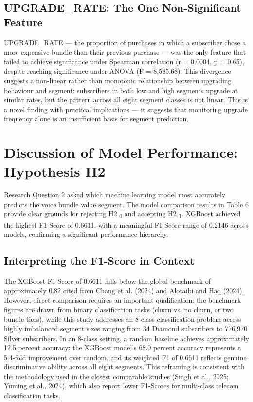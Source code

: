 \subsection{UPGRADE\_RATE: The One Non-Significant Feature}

UPGRADE\_RATE --- the proportion of purchases in which a subscriber chose a more expensive bundle than their previous purchase --- was the only feature that failed to achieve significance under Spearman correlation (r = 0.0004, p = 0.65), despite reaching significance under ANOVA (F = 8,585.68). This divergence suggests a non-linear rather than monotonic relationship between upgrading behaviour and segment: subscribers in both low and high segments upgrade at similar rates, but the pattern across all eight segment classes is not linear. This is a novel finding with practical implications --- it suggests that monitoring upgrade frequency alone is an insufficient basis for segment prediction.


\section{Discussion of Model Performance: Hypothesis H2}

Research Question 2 asked which machine learning model most accurately predicts the voice bundle value segment. The model comparison results in Table 6 provide clear grounds for rejecting H2	\textsubscript{0} and accepting H2	\textsubscript{1}. XGBoost achieved the highest F1-Score of 0.6611, with a meaningful F1-Score range of 0.2146 across models, confirming a significant performance hierarchy.


\subsection{Interpreting the F1-Score in Context}

The XGBoost F1-Score of 0.6611 falls below the global benchmark of approximately 0.82 cited from Chang et al. (2024) and Alotaibi and Haq (2024). However, direct comparison requires an important qualification: the benchmark figures are drawn from binary classification tasks (churn vs. no churn, or two bundle tiers), while this study addresses an 8-class classification problem across highly imbalanced segment sizes ranging from 34 Diamond subscribers to 776,970 Silver subscribers. In an 8-class setting, a random baseline achieves approximately 12.5 percent accuracy; the XGBoost model's 68.0 percent accuracy represents a 5.4-fold improvement over random, and its weighted F1 of 0.6611 reflects genuine discriminative ability across all eight segments. This reframing is consistent with the methodology used in the closest comparable studies (Singh et al., 2025; Yuming et al., 2024), which also report lower F1-Scores for multi-class telecom classification tasks.


